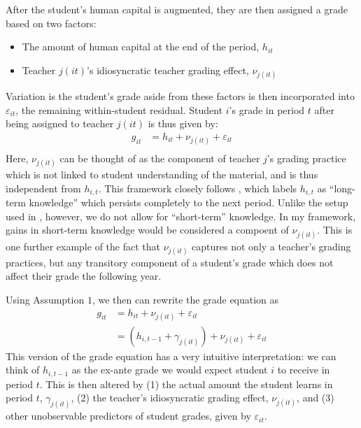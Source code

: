 \documentclass[../thesis_main.tex]{subfiles}
\begin{document}
\noindent After the student's human capital is augmented, they are then assigned a grade based on two factors:
\begin{itemize}
	\item The amount of human capital at the end of the period, $h_{it}$
	\item Teacher $j(it)$'s idiosyncratic teacher grading effect, $\nu_{j(it)}$
\end{itemize}
Variation is the student's grade aside from these factors is then incorporated into $\varepsilon_{it}$, the remaining within-student residual. Student $i$'s grade in period $t$ after being assigned to teacher $j(it)$ is thus given by:
\begin{equation}
\begin{split}
 	g_{it} & = h_{it}+\nu_{j(it)}+\varepsilon_{it}\\
\end{split}
\end{equation}
Here, $\nu_{j(it)}$ can be thought of as the component of teacher $j$'s grading practice which is not linked to student understanding of the material, and is thus independent from $h_{i,t}$. This framework closely follows \citet{gilraineMakingTeachingLast2020}, which labels $h_{i,t}$ as ``long-term knowledge'' which persists completely to the next period. Unlike the setup used in \citet{gilraineMakingTeachingLast2020}, however, we do not allow for ``short-term'' knowledge. In my framework, gains in short-term knowledge would be considered a compoent of $\nu_{j(it)}$. This is one further example of the fact that $\nu_{j(it)}$ captures not only a teacher's grading practices, but any transitory component of a student's grade which does not affect their grade the following year. 

Using Assumption $1$, we then can rewrite the grade equation as 
\begin{equation}
\begin{split}
	\label{eqn:grade_eqn}
 	g_{it} & = h_{it}+\nu_{j(it)}+\varepsilon_{it}\\\
 	& = (h_{i,t-1} + \gamma_{j(it)}) + \nu_{j(it)} + \varepsilon_{it}
\end{split}
\end{equation}
This version of the grade equation has a very intuitive interpretation: we can think of $h_{i,t-1}$ as the ex-ante grade we would expect student $i$ to receive in period $t$. This is then altered by (1) the actual amount the student learns in period $t$, $\gamma_{j(it)}$, (2) the teacher's idiosyncratic grading effect, $\nu_{j(it)}$, and (3) other unobservable predictors of student grades, given by $\varepsilon_{it}$. 
\end{document}
